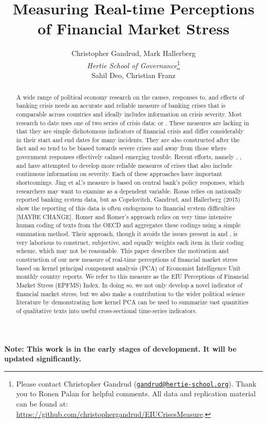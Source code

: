 \documentclass[]{article}
\title{Measuring Real-time Perceptions of Financial Market Stress}
\author{Christopher Gandrud, Mark Hallerberg \\ \emph{Hertie School of Governance}\footnote{Please contact Christopher Gandrud
(\href{mailto:gandrud@hertie-school.org}{\nolinkurl{gandrud@hertie-school.org}}).
Thank you to Ronen Palan for helpful comments. All data and
replication material can be found at:
\url{https://github.com/christophergandrud/EIUCrisesMeasure}.} \\
Sahil Deo, Christian Franz}
\begin{document}
\maketitle


\textbf{Note: This work is in the early stages of development. It will
be updated significantly.}

\begin{abstract}
A wide range of political economy research on the causes, responses to, and effects of banking crisis needs an accurate and reliable measure of banking crises that is comparable across countries and ideally includes information on crisis severity. Most research to date uses one of two series of crisis data: \cite{Reinhart2009} or \cite{laeven2013}. These measures are lacking in that they are simple dichotomous indicators of financial crisis and differ considerably in their start and end dates for many incidents. They are also constructed after the fact and so tend to be biased towards severe crises and away from those where government responses effectively calmed emerging trouble. Recent efforts, namely \cite{Jing2015}, \cite{Rosas2009}, and \cite{Romer2015} have attempted to develop more reliable measures of crises that also include continuous information on severity. Each of these approaches have important shortcomings. Jing et al.’s measure is based on central bank’s policy responses, which researchers may want to examine as a dependent variable. Rosas relies on nationally reported banking system data, but as Copelovitch, Gandrud, and Hallerberg (2015) show the reporting of this data is often endogenous to financial system difficulties [MAYBE CHANGE]. Romer and Romer’s approach relies on very time intensive human coding of texts from the OECD and aggregates these codings using a simple summation method. Their approach, though it avoids the issues present in \cite{Jing2015} and \cite{Rosas2009}, is very laborious to construct, subjective, and equally weights each item in their coding scheme, which may not be reasonable. This paper describes the motivation and construction of our new measure of real-time perceptions of financial market stress based on kernel principal component analysis (PCA) of Economist Intelligence Unit monthly country reports. We refer to this measure as the EIU Perceptions of Financial Market Stress (EPFMS) Index. In doing so, we not only develop a novel indicator of financial market stress, but we also make a contribution to the wider political science literature by demonstrating how kernel PCA can be used to summarize vast quantities of qualitative texts into useful cross-sectional time-series indicators.
\end{abstract}
\end{document}
